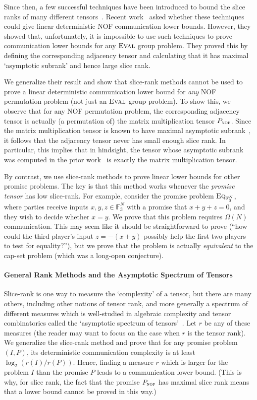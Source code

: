 \documentclass[10pt,a4paper]{article}
\newcommand{\F}{\mathbb{F}}
\newcommand{\eq}{\textsc{Eq}}
\newcommand{\mmP}{P_{\textsc{nof}}}
\begin{document}
     Since then, a few successful techniques have been introduced to bound the slice ranks of many different tensors~\cite{T16,BCHGNSU17}. Recent work~\cite{CFTZ22} asked whether these techniques could give linear deterministic NOF communication lower bounds. However, they showed that, unfortunately, it is impossible to use such techniques to prove communication lower bounds for any $\textsc{Eval}$ group problem. They proved this by defining the corresponding adjacency tensor and calculating that it has maximal `asymptotic subrank' and hence large slice rank.

     We generalize their result and show that slice-rank methods cannot be used to prove a linear deterministic communication lower bound for \emph{any} NOF permutation problem (not just an $\textsc{Eval}$ group problem). To show this, we observe that for any NOF permutation problem, the corresponding adjacency tensor is actually (a permutation of) the matrix multiplication tensor $\mmP$. Since the matrix multiplication tensor is known to have maximal asymptotic subrank~\cite{S86}, it follows that the adjacency tensor never has small enough slice rank. In particular, this implies that in hindsight, the tensor whose asymptotic subrank was computed in the prior work~\cite{CFTZ22} is exactly the matrix multiplication tensor.

     By contrast, we use slice-rank methods to prove linear lower bounds for other promise problems. The key is that this method works whenever the \emph{promise tensor} has low slice-rank. For example, consider the promise problem $\eq_{\F_3^N}$, where parties receive inputs $x,y,z \in \F_3^N$ with a promise that $x+y+z = 0$, and they wish to decide whether $x=y$. We prove that this problem requires $\Omega(N)$ communication. This may seem like it should be straightforward to prove (``how could the third player's input $z=-(x+y)$ possibly help the first two players to test for equality?''), but we prove that the problem is actually \emph{equivalent} to the cap-set problem (which was a long-open conjecture).

     \paragraph{General Rank Methods and the Asymptotic Spectrum of Tensors}

     Slice-rank is one way to measure the `complexity' of a tensor, but there are many others, including other notions of tensor rank, and more generally a spectrum of different measures which is well-studied in algebraic complexity and tensor combinatorics called the `asymptotic spectrum of tensors'~\cite{S86,WZ22}. Let $r$ be any of these measures (the reader may want to focus on the case when $r$ is the tensor rank). We generalize the slice-rank method and prove that for any promise problem $(I,P)$, its deterministic communication complexity is at least $\log_2(r(I) / r(P))$. Hence, finding a measure $r$ which is larger for the problem $I$ than the promise $P$ leads to a communication lower bound. (This is why, for slice rank, the fact that the promise $\mmP$ has maximal slice rank means that a lower bound cannot be proved in this way.)
\end{document}
